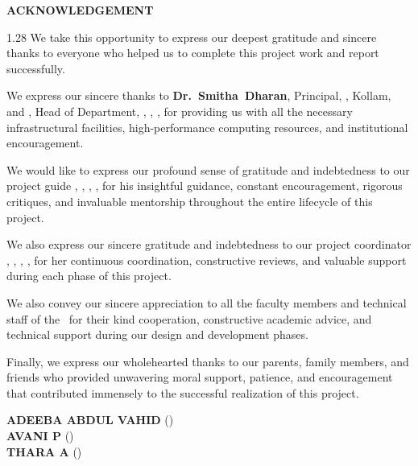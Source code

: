 \newpage
\thispagestyle{plain}

\begin{center}
\vspace*{10pt}
{\bfseries\Large ACKNOWLEDGEMENT}\\[18pt]
\end{center}

\begin{spacing}{1.28}
\fontsize{12pt}{17pt}\selectfont
\justifying
\noindent We take this opportunity to express our deepest gratitude and sincere thanks to everyone who helped us to complete this project work and report successfully.

\vspace{8pt}

\noindent We express our sincere thanks to \mbox{\textbf{Dr.~Smitha Dharan}}, Principal, \college, Kollam, and \mbox{\textbf{\hod}}, Head of Department, \dept, \college, \collegeplace, for providing us with all the necessary infrastructural facilities, high-performance computing resources, and institutional encouragement.

\vspace{8pt}

\noindent We would like to express our profound sense of gratitude and indebtedness to our project guide \mbox{\textbf{\guide}}, \guidedes, \dept, \college, for his insightful guidance, constant encouragement, rigorous critiques, and invaluable mentorship throughout the entire lifecycle of this project.

\vspace{8pt}

\noindent We also express our sincere gratitude and indebtedness to our project coordinator \mbox{\textbf{\coordinator}}, \coordinatordes, \dept, \college, for her continuous coordination, constructive reviews, and valuable support during each phase of this project.

\vspace{8pt}

\noindent We also convey our sincere appreciation to all the faculty members and technical staff of the \dept\ for their kind cooperation, constructive academic advice, and technical support during our design and development phases.

\vspace{8pt}

\noindent Finally, we express our wholehearted thanks to our parents, family members, and friends who provided unwavering moral support, patience, and encouragement that contributed immensely to the successful realization of this project.

\vspace*{20pt}
\begin{flushright}
	\fontsize{12pt}{16pt}\selectfont
	\textbf{ADEEBA ABDUL VAHID} (\rollnoA) \\[4pt]
	\textbf{AVANI P} (\rollnoB) \\[4pt]
	\textbf{THARA A} (\rollnoC)
\end{flushright}
\end{spacing}

\thispagestyle{plain}
